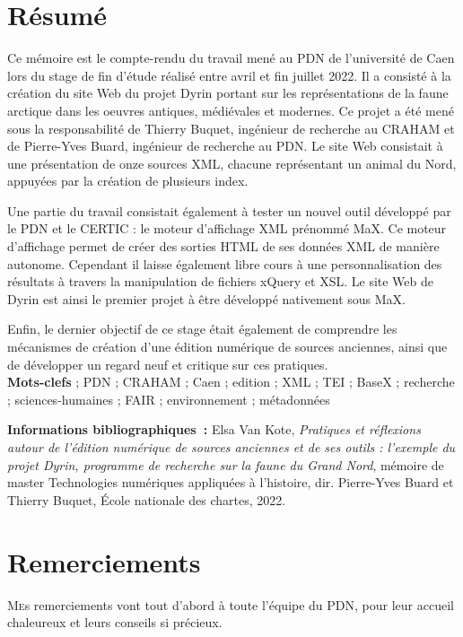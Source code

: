 \documentclass[a4paper,12pt,twoside]{book}
\begin{document}
	\chapter{Résumé}
	\medskip
	Ce mémoire est le compte-rendu du travail mené au \acrfull{PDN} de l'université de Caen lors du stage de fin d'étude réalisé entre avril et fin juillet 2022. Il a consisté à la création du site Web du projet Dyrin portant sur les représentations de la faune arctique dans les oeuvres antiques, médiévales et modernes. Ce projet a été mené sous la responsabilité de Thierry Buquet, ingénieur de recherche au \acrfull{CRAHAM} et de Pierre-Yves Buard, ingénieur de recherche au \acrlong{PDN}. Le site Web consistait à une présentation de onze sources XML, chacune représentant un animal du Nord, appuyées par la création de plusieurs index.
	
	Une partie du travail consistait également à tester un nouvel outil développé par le \acrshort{PDN} et le \acrfull{CERTIC} : le moteur d'affichage XML prénommé MaX. Ce moteur d'affichage permet de créer des sorties HTML de ses données XML de manière autonome. Cependant il laisse également libre cours à une personnalisation des résultats à travers la manipulation de fichiers xQuery et XSL. Le site Web de Dyrin est ainsi le premier projet à être développé nativement sous MaX.
	
	Enfin, le dernier objectif de ce stage était également de comprendre les mécanismes de création d'une édition numérique de sources anciennes, ainsi que de développer un regard neuf et critique sur ces pratiques. \\
	
	\textbf{Mots-clefs} ; {PDN} ; {CRAHAM} ; {Caen} ; {edition} ; {XML} ; {TEI} ; {BaseX} ; {recherche} ; {sciences-humaines} ; {FAIR} ; {environnement} ; {métadonnées}
	
	\textbf{Informations bibliographiques~:} Elsa Van Kote, \textit{Pratiques et réflexions autour de l'édition numérique de sources anciennes et de ses outils : l'exemple du projet Dyrin, programme de recherche sur la faune du Grand Nord}, mémoire de master \og{}Technologies numériques appliquées à l'histoire\fg{}, dir. Pierre-Yves Buard et Thierry Buquet, École nationale des chartes, 2022.
	
	\chapter{Remerciements}
	
	\lettrine{M}es remerciements vont tout d'abord à toute l'équipe du \acrshort{PDN}, pour leur accueil chaleureux et leurs conseils si précieux.\\
	
\end{document}
